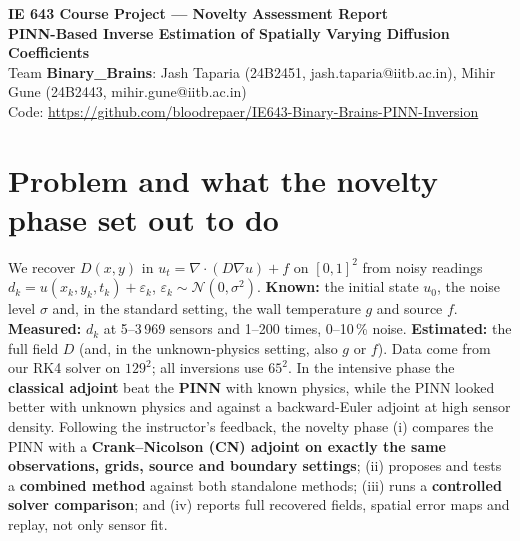 \documentclass[10pt,a4paper]{article}
\begin{document}
\begin{center}
{\large\bfseries IE 643 Course Project --- Novelty Assessment Report}\\[2pt]
{\bfseries PINN-Based Inverse Estimation of Spatially Varying Diffusion Coefficients}\\[2pt]
Team \textbf{Binary\_Brains}: Jash Taparia (24B2451, jash.taparia@iitb.ac.in), Mihir Gune (24B2443, mihir.gune@iitb.ac.in)\\
Code: \url{https://github.com/bloodrepaer/IE643-Binary-Brains-PINN-Inversion}
\end{center}
\vspace{-4pt}

\section{Problem and what the novelty phase set out to do}
We recover $D(x,y)$ in $u_t=\nabla\!\cdot\!(D\nabla u)+f$ on $[0,1]^2$ from noisy readings
$d_k=u(x_k,y_k,t_k)+\varepsilon_k$, $\varepsilon_k\sim\mathcal N(0,\sigma^2)$. \textbf{Known:} the initial state $u_0$, the
noise level $\sigma$ and, in the standard setting, the wall temperature $g$ and source $f$. \textbf{Measured:} $d_k$ at
5--3\,969 sensors and 1--200 times, 0--10\,\% noise. \textbf{Estimated:} the full field $D$ (and, in the
unknown-physics setting, also $g$ or $f$). Data come from our RK4 solver on $129^2$; all inversions use $65^2$.
In the intensive phase the \textcolor{adj}{\textbf{classical adjoint}} beat the \textcolor{pinn}{\textbf{PINN}} with
known physics, while the PINN looked better with unknown physics and against a backward-Euler adjoint at high sensor
density. Following the instructor's feedback, the novelty phase (i) compares the PINN with a
\textbf{Crank--Nicolson (CN) adjoint on exactly the same observations, grids, source and boundary settings};
(ii) proposes and tests a \textbf{combined method} against both standalone methods; (iii) runs a
\textbf{controlled solver comparison}; and (iv) reports full recovered fields, spatial error maps and replay, not
only sensor fit.
\end{document}
